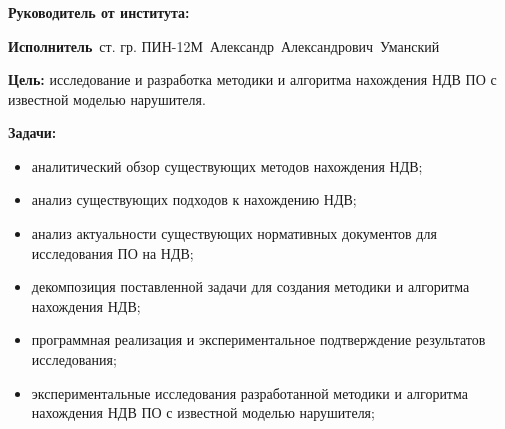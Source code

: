 \begin{frame}
    \frametitle{\textbf{\thesisTitle}}
\textbf{Руководитель от института:}~\supervisorRegaliaShort~\supervisorFioShort

\textbf{Исполнитель}~ст. гр. ПИН-12М~Александр~Александрович~Уманский

\textbf{Цель:} исследование и разработка методики и алгоритма нахождения НДВ ПО с известной моделью нарушителя.

\textbf{Задачи:}
\begin{itemize}
    \item аналитический обзор существующих методов нахождения НДВ;
    \item анализ существующих подходов к нахождению НДВ;
    \item анализ актуальности существующих нормативных документов для исследования ПО на НДВ;
    \item декомпозиция поставленной задачи для создания методики и алгоритма нахождения НДВ;
    \item программная реализация и экспериментальное подтверждение результатов исследования;
    \item экспериментальные исследования разработанной методики и алгоритма нахождения НДВ ПО с известной моделью нарушителя;
\end{itemize}
\end{frame}
